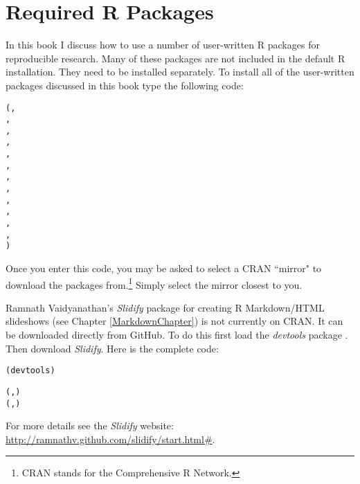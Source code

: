


\chapter*{Required R Packages} \label{ReqPackages}

In this book I discuss how to use a number of user-written R packages for reproducible research. Many of these packages are not included in the default R installation. They need to be installed separately. To install all of the user-written packages discussed in this book type the following code:

\begin{knitrout}
\color{fgcolor}\begin{kframe}
\begin{alltt}
(, 
                , 
                ,
                , 
                , 
                , 
                , 
                , 
                ,
                ,
                ,                     
                , 
                )
\end{alltt}
\end{kframe}
\end{knitrout}


\noindent Once you enter this code, you may be asked to select a CRAN ``mirror" to download the packages from.\footnote{CRAN stands for the Comprehensive R Network.} Simply select the mirror closest to you.

 Ramnath Vaidyanathan's \emph{Slidify} package \citeyearpar{R-slidify} for creating R Markdown/HTML slideshows (see Chapter \ref{MarkdownChapter}) is not currently on CRAN. It can be downloaded directly from GitHub. To do this first load the \emph{devtools} package \cite[]{R-devtools}. Then download \emph{Slidify}. Here is the complete code:

\begin{knitrout}
\color{fgcolor}\begin{kframe}
\begin{alltt}
(devtools)

(, )
(, )
\end{alltt}
\end{kframe}
\end{knitrout}


\noindent For more details see the \emph{Slidify} website: \url{http://ramnathv.github.com/slidify/start.html#}.



